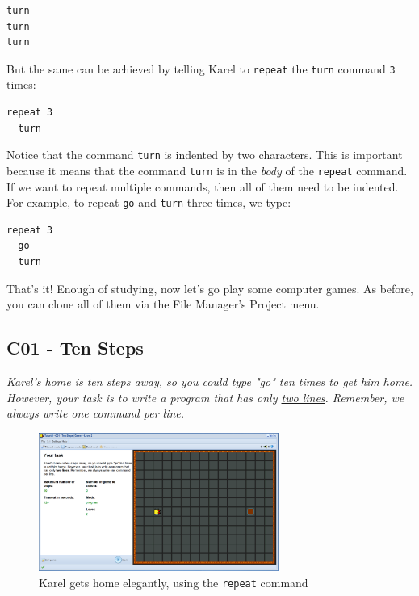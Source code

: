 \documentclass[article,A4,12pt]{llncs}
\begin{document}
\begin{verbatim}
turn
turn
turn
\end{verbatim}
But the same can be achieved by telling Karel to {\tt repeat} the {\tt turn} command {\tt 3} times:

\begin{verbatim}
repeat 3
  turn
\end{verbatim}
Notice that the command {\tt turn} is indented by two characters. This is important
because it means that the command {\tt turn} is in the {\em body} of the {\tt repeat} 
command. If we want to repeat multiple commands, then all of them need to be indented. 
For example, to repeat {\tt go} and {\tt turn} three times, we type:

\begin{verbatim}
repeat 3
  go
  turn
\end{verbatim}
That's it! Enough of studying, now let's go play some computer
games. As before, you can clone all of them via the File Manager's Project menu.

 
\subsection{C01 - Ten Steps}

{\em Karel's home is ten steps away, so you could type "go" ten times to get him home. 
However, your task is to write a program that has only \underline{two lines}. Remember, we always 
write one command per line.}

\begin{figure}[!ht]
\begin{center}
\includegraphics[width=0.7\textwidth]{img/c01.png}
\end{center}
\vspace{-4mm}
\caption{Karel gets home elegantly, using the {\tt repeat} command}
\label{fig:c01}
\vspace{-4mm}
\end{figure}
\noindent
\end{document}
